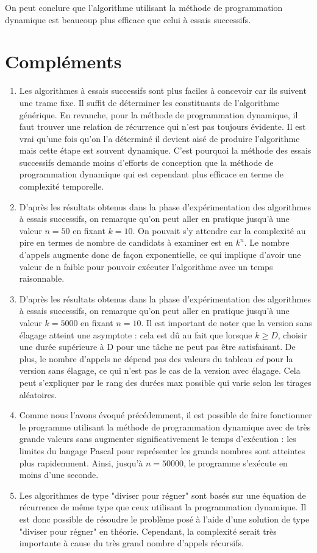 \documentclass[a4paper, titlepage]{article}
\begin{document}
		On peut conclure que l'algorithme utilisant la méthode de programmation dynamique est beaucoup plus efficace que celui à essais successifs.
		
\section{Compléments}
\begin{enumerate}
\item
	Les algorithmes à essais successifs sont plus faciles à concevoir car ils suivent une trame fixe.
	Il suffit de déterminer les constituants de l'algorithme générique.
	En revanche, pour la méthode de programmation dynamique, il faut trouver une relation de récurrence qui n'est pas toujours évidente.
	Il est vrai qu'une fois qu'on l'a déterminé il devient aisé de produire l'algorithme mais cette étape est souvent dynamique.
	C'est pourquoi la méthode des essais successifs demande moins d'efforts de conception que la méthode de programmation dynamique qui est cependant plus efficace en terme de complexité temporelle.
\item
	D'après les résultats obtenus dans la phase d'expérimentation des algorithmes à essais successifs, on remarque qu'on peut aller en pratique jusqu'à une valeur $n = 50$ en fixant $k = 10$.
	On pouvait s'y attendre car la complexité au pire en termes de nombre de candidats à examiner est en $k^n$.
	Le nombre d'appels augmente donc de façon exponentielle, ce qui implique d'avoir une valeur de n faible pour pouvoir exécuter l'algorithme avec un temps raisonnable.
\item
	D'après les résultats obtenus dans la phase d'expérimentation des algorithmes à essais successifs, on remarque qu'on peut aller en pratique jusqu'à une valeur $k = 5000$ en fixant $n = 10$.
	Il est important de noter que la version sans élagage atteint une asymptote : cela est dû au fait que lorsque $k \ge D$, choisir une durée supérieure à D pour une tâche ne peut pas être satisfaisant.
	De plus, le nombre d'appels ne dépend pas des valeurs du tableau \emph{cd} pour la version sans élagage, ce qui n'est pas le cas de la version avec élagage.
	Cela peut s'expliquer par le rang des durées max possible qui varie selon les tirages aléatoires.
\item
	Comme nous l'avons évoqué précédemment, il est possible de faire fonctionner le programme utilisant la méthode de programmation dynamique avec de très grande valeurs sans augmenter significativement le temps d'exécution :
	les limites du langage Pascal pour représenter les grands nombres sont atteintes plus rapidemment. Ainsi, jusqu'à $n = 50000$, le programme s'exécute en moins d'une seconde.
\item
	Les algorithmes de type "diviser pour régner" sont basés sur une équation de récurrence de même type que ceux utilisant la programmation dynamique.
	Il est donc possible de résoudre le problème posé à l'aide d'une solution de type "diviser pour régner" en théorie.
	Cependant, la complexité serait très importante à cause du très grand nombre d'appels récursifs.
\end{enumerate}
\end{document}
